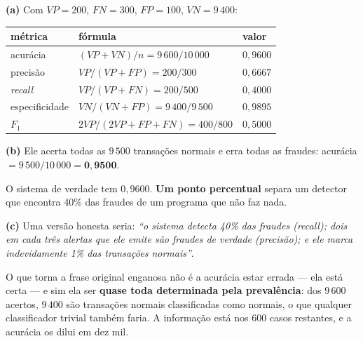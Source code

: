 \documentclass[11pt,a4paper]{article}
\begin{document}
\begin{solucao}
\textbf{(a)} Com $VP=200$, $FN=300$, $FP=100$, $VN=9\,400$:
\begin{center}\small
\renewcommand{\arraystretch}{1.4}
\begin{tabular}{@{}lll@{}}
\toprule
métrica & fórmula & valor \\
\midrule
acurácia        & $(VP+VN)/n = 9\,600/10\,000$      & $0{,}9600$ \\
precisão        & $VP/(VP+FP) = 200/300$            & $0{,}6667$ \\
\emph{recall}   & $VP/(VP+FN) = 200/500$            & $0{,}4000$ \\
especificidade  & $VN/(VN+FP) = 9\,400/9\,500$      & $0{,}9895$ \\
$F_1$           & $2VP/(2VP+FP+FN) = 400/800$       & $0{,}5000$ \\
\bottomrule
\end{tabular}
\end{center}

\smallskip
\textbf{(b)} Ele acerta todas as $9\,500$ transações normais e erra todas as
fraudes: acurácia $=9\,500/10\,000=\mathbf{0{,}9500}$.

O sistema de verdade tem $0{,}9600$. \textbf{Um ponto percentual} separa um
detector que encontra 40\% das fraudes de um programa que não faz nada.

\smallskip
\textbf{(c)} Uma versão honesta seria: \emph{``o sistema detecta 40\% das fraudes
(\emph{recall}); dois em cada três alertas que ele emite são fraudes de verdade
(precisão); e ele marca indevidamente 1\% das transações normais''}.

O que torna a frase original enganosa não é a acurácia estar errada --- ela está
certa --- e sim ela ser \textbf{quase toda determinada pela prevalência}: dos
$9\,600$ acertos, $9\,400$ são transações normais classificadas como normais, o
que qualquer classificador trivial também faria. A informação está nos $600$
casos restantes, e a acurácia os dilui em dez mil.


\end{solucao}
\end{document}
